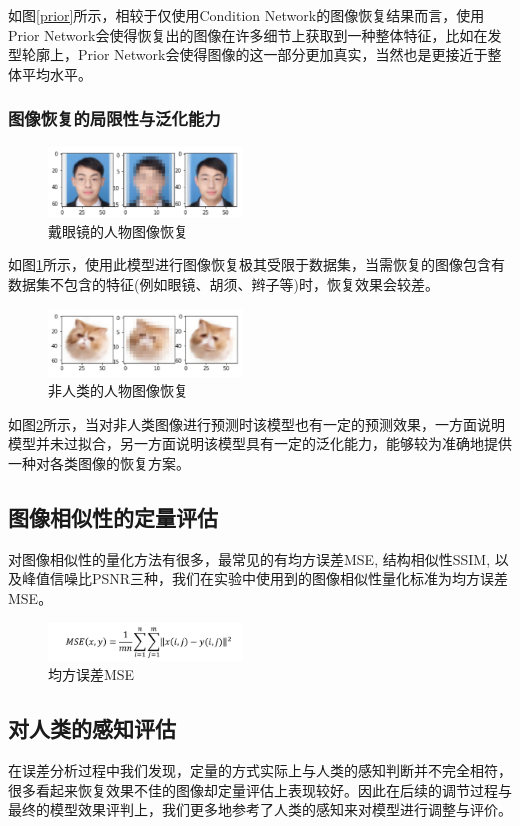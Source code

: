 如图\ref{prior}所示，相较于仅使用Condition Network的图像恢复结果而言，使用Prior Network会使得恢复出的图像在许多细节上获取到一种整体特征，比如在发型轮廓上，Prior Network会使得图像的这一部分更加真实，当然也是更接近于整体平均水平。

\subsubsection{图像恢复的局限性与泛化能力}

\begin{figure}[htp]
    \centering
    \includegraphics[width=0.46\textwidth]{figures/ly}
    \caption{戴眼镜的人物图像恢复}
    \label{ly}
\end{figure}

如图\ref{ly}所示，使用此模型进行图像恢复极其受限于数据集，当需恢复的图像包含有数据集不包含的特征(例如眼镜、胡须、辫子等)时，恢复效果会较差。

\begin{figure}[htp]
    \centering
    \includegraphics[width=0.46\textwidth]{figures/cat}
    \caption{非人类的人物图像恢复}
    \label{cat}
\end{figure}

如图\ref{cat}所示，当对非人类图像进行预测时该模型也有一定的预测效果，一方面说明模型并未过拟合，另一方面说明该模型具有一定的泛化能力，能够较为准确地提供一种对各类图像的恢复方案。

\subsection{图像相似性的定量评估}
对图像相似性的量化方法有很多，最常见的有均方误差MSE, 结构相似性SSIM, 以及峰值信噪比PSNR三种，我们在实验中使用到的图像相似性量化标准为均方误差MSE。

\begin{figure}[htp]
    \centering
    \includegraphics[width=0.46\textwidth]{figures/mse}
    \caption{均方误差MSE}
\end{figure}

\subsection{对人类的感知评估}
在误差分析过程中我们发现，定量的方式实际上与人类的感知判断并不完全相符，很多看起来恢复效果不佳的图像却定量评估上表现较好。因此在后续的调节过程与最终的模型效果评判上，我们更多地参考了人类的感知来对模型进行调整与评价。
